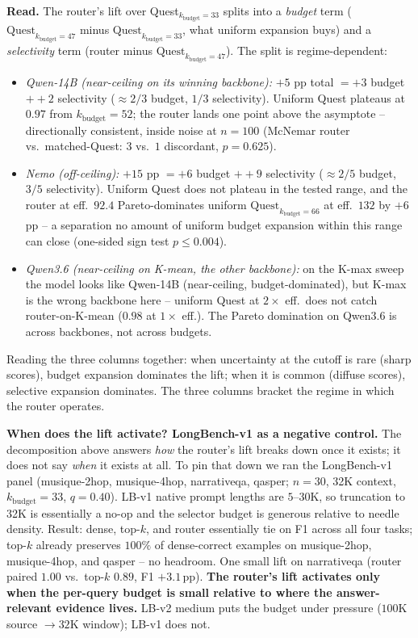 \documentclass[11pt]{article}
\theoremstyle{remark}
\newcommand{\kbudget}{k_{\text{budget}}}
\begin{document}
\textbf{Read.} The router's lift over Quest$_{\kbudget=33}$ splits into a \emph{budget} term ($\text{Quest}_{\kbudget=47}$ minus $\text{Quest}_{\kbudget=33}$, what uniform expansion buys) and a \emph{selectivity} term (router minus $\text{Quest}_{\kbudget=47}$). The split is regime-dependent:
\begin{itemize}[leftmargin=*,topsep=0.2em,itemsep=0.1em]
    \item \emph{Qwen-14B (near-ceiling on its winning backbone):} $+5$ pp total $= +3$ budget $+ +2$ selectivity ($\approx 2/3$ budget, $1/3$ selectivity). Uniform Quest plateaus at $0.97$ from $\kbudget=52$; the router lands one point above the asymptote -- directionally consistent, inside noise at $n=100$ (McNemar router vs.\ matched-Quest: $3$ vs.\ $1$ discordant, $p=0.625$).
    \item \emph{Nemo (off-ceiling):} $+15$ pp $= +6$ budget $+ +9$ selectivity ($\approx 2/5$ budget, $3/5$ selectivity). Uniform Quest does not plateau in the tested range, and the router at eff.\ $92.4$ Pareto-dominates uniform $\text{Quest}_{\kbudget=66}$ at eff.\ $132$ by $+6$\,pp -- a separation no amount of uniform budget expansion within this range can close (one-sided sign test $p \le 0.004$).
    \item \emph{Qwen3.6 (near-ceiling on K-mean, the \emph{other} backbone):} on the K-max sweep the model looks like Qwen-14B (near-ceiling, budget-dominated), but K-max is the wrong backbone here -- uniform Quest at $2\times$ eff.\ does not catch router-on-K-mean ($0.98$ at $1\times$ eff.). The Pareto domination on Qwen3.6 is across backbones, not across budgets.
\end{itemize}
Reading the three columns together: when uncertainty at the cutoff is rare (sharp scores), budget expansion dominates the lift; when it is common (diffuse scores), selective expansion dominates. The three columns bracket the regime in which the router operates.

\textbf{When does the lift activate? LongBench-v1 as a negative control.} The decomposition above answers \emph{how} the router's lift breaks down once it exists; it does not say \emph{when} it exists at all. To pin that down we ran the LongBench-v1 panel (musique-2hop, musique-4hop, narrativeqa, qasper; $n=30$, 32K context, $\kbudget=33$, $q=0.40$). LB-v1 native prompt lengths are $5$--$30$K, so truncation to 32K is essentially a no-op and the selector budget is generous relative to needle density. Result: dense, top-$k$, and router essentially tie on F1 across all four tasks; top-$k$ already preserves $100\%$ of dense-correct examples on musique-2hop, musique-4hop, and qasper -- no headroom. One small lift on narrativeqa (router paired $1.00$ vs.\ top-$k$ $0.89$, F1 $+3.1$\,pp). \textbf{The router's lift activates only when the per-query budget is small relative to where the answer-relevant evidence lives.} LB-v2 medium puts the budget under pressure ($100$K source $\to 32$K window); LB-v1 does not.
\end{document}
